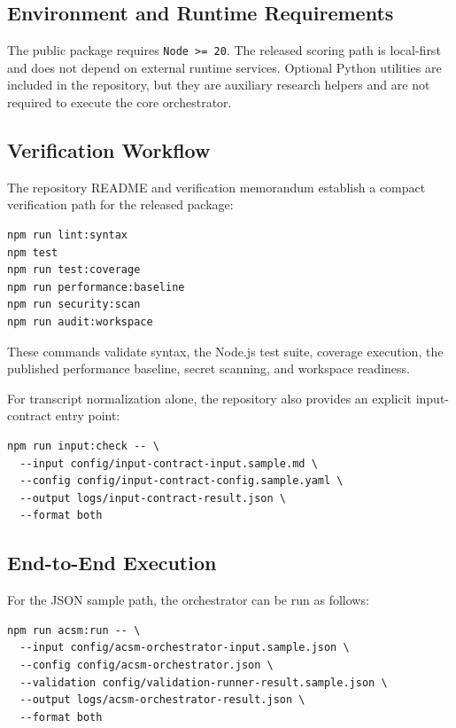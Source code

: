 \documentclass[11pt,a4paper]{article}
\begin{document}
\subsection{Environment and Runtime Requirements}

The public package requires \texttt{Node >= 20}. The released scoring path is local-first and does not depend on external runtime services. Optional Python utilities are included in the repository, but they are auxiliary research helpers and are not required to execute the core orchestrator.

\subsection{Verification Workflow}

The repository README and verification memorandum establish a compact verification path for the released package:

\begin{verbatim}
npm run lint:syntax
npm test
npm run test:coverage
npm run performance:baseline
npm run security:scan
npm run audit:workspace
\end{verbatim}

These commands validate syntax, the Node.js test suite, coverage execution, the published performance baseline, secret scanning, and workspace readiness.

For transcript normalization alone, the repository also provides an explicit input-contract entry point:

\begin{verbatim}
npm run input:check -- \
  --input config/input-contract-input.sample.md \
  --config config/input-contract-config.sample.yaml \
  --output logs/input-contract-result.json \
  --format both
\end{verbatim}

\subsection{End-to-End Execution}

For the JSON sample path, the orchestrator can be run as follows:

\begin{verbatim}
npm run acsm:run -- \
  --input config/acsm-orchestrator-input.sample.json \
  --config config/acsm-orchestrator.json \
  --validation config/validation-runner-result.sample.json \
  --output logs/acsm-orchestrator-result.json \
  --format both
\end{verbatim}
\end{document}
